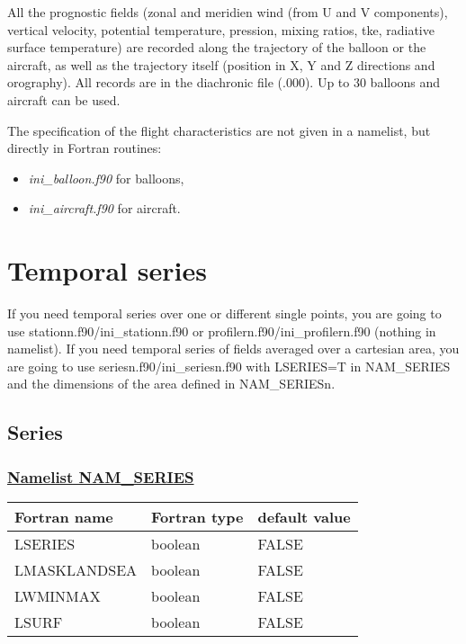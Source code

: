 All the prognostic fields (zonal and meridien wind
(from U and V components), vertical velocity, potential temperature, pression,
mixing ratios, tke, radiative surface temperature)
are recorded along the trajectory
of the balloon or the aircraft, as well as the trajectory itself (position in
X, Y and Z directions and orography).
All records are in the diachronic file (.000). Up to 30 balloons and aircraft
can be used.

The specification of the flight characteristics  are not given in a namelist,
but directly in Fortran routines:
\begin{itemize}
\item  {\it ini\_balloon.f90} for balloons,
\item  {\it ini\_aircraft.f90} for aircraft.
\end{itemize}

\section{Temporal series}
If you need temporal series over one or different single points, you are going to use stationn.f90/ini\_stationn.f90 or profilern.f90/ini\_profilern.f90 (nothing in namelist). If you need temporal series of fields averaged over a cartesian area, you are going to use seriesn.f90/ini\_seriesn.f90 with LSERIES=T in NAM\_SERIES and the dimensions of the area defined in NAM\_SERIESn.

\subsection{Series}
 
\subsubsection{\underline{Namelist NAM\_SERIES}}
\label{ss:series}
\begin{center}
\begin{tabular}{|l|l|l| }
\hline 
 Fortran name & Fortran type  & default value \\
\hline
LSERIES      & boolean & FALSE \\
LMASKLANDSEA & boolean & FALSE \\
LWMINMAX     & boolean & FALSE \\
LSURF        & boolean & FALSE \\
\hline
\end{tabular}
\end{center}

